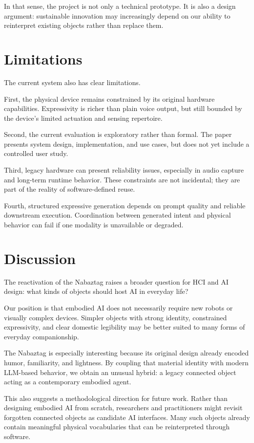 \documentclass[11pt]{article}
\begin{document}
In that sense, the project is not only a technical prototype. It is also a design argument: sustainable innovation may increasingly depend on our ability to reinterpret existing objects rather than replace them.

\section{Limitations}

The current system also has clear limitations.

First, the physical device remains constrained by its original hardware capabilities. Expressivity is richer than plain voice output, but still bounded by the device's limited actuation and sensing repertoire.

Second, the current evaluation is exploratory rather than formal. The paper presents system design, implementation, and use cases, but does not yet include a controlled user study.

Third, legacy hardware can present reliability issues, especially in audio capture and long-term runtime behavior. These constraints are not incidental; they are part of the reality of software-defined reuse.

Fourth, structured expressive generation depends on prompt quality and reliable downstream execution. Coordination between generated intent and physical behavior can fail if one modality is unavailable or degraded.

\section{Discussion}

The reactivation of the Nabaztag raises a broader question for HCI and AI design: what kinds of objects should host AI in everyday life?

Our position is that embodied AI does not necessarily require new robots or visually complex devices. Simpler objects with strong identity, constrained expressivity, and clear domestic legibility may be better suited to many forms of everyday companionship.

The Nabaztag is especially interesting because its original design already encoded humor, familiarity, and lightness. By coupling that material identity with modern LLM-based behavior, we obtain an unusual hybrid: a legacy connected object acting as a contemporary embodied agent.

This also suggests a methodological direction for future work. Rather than designing embodied AI from scratch, researchers and practitioners might revisit forgotten connected objects as candidate AI interfaces. Many such objects already contain meaningful physical vocabularies that can be reinterpreted through software.
\end{document}
